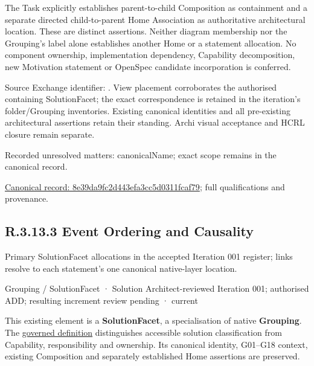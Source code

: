 The Task explicitly establishes parent-to-child Composition as containment and
a separate directed child-to-parent Home Association as authoritative architectural
location. These are distinct assertions. Neither diagram membership nor the
Grouping's label alone establishes another Home or a statement allocation.
No component ownership, implementation dependency, Capability decomposition,
new Motivation statement or OpenSpec candidate incorporation is conferred.



Source Exchange identifier: \texttt{}. View placement corroborates
the authorised containing SolutionFacet; the exact correspondence is retained in the
iteration's folder/Grouping inventories. Existing canonical identities and all
pre-existing architectural assertions retain their standing. Archi visual
acceptance and HCRL closure remain separate.


{\small Recorded unresolved matters: canonicalName; exact scope remains in the canonical record.}\par
{\footnotesize \href{../../../../../../../continuum/grouping/8e39da9fc2d443efa3cc5d0311fcaf79.md}{Canonical record: 8e39da9fc2d443efa3cc5d0311fcaf79}; full qualifications and provenance.}\par
\subsection*{R.3.13.3 Event Ordering and Causality}
\label{navigation:R.3.13.3}

Primary SolutionFacet allocations in the accepted Iteration 001 register; links resolve to each statement’s one canonical native-layer location.\par
\label{element:432d52cc3de5443896a4559f215ece9f}
{\small Grouping / SolutionFacet · Solution Architect-reviewed Iteration 001; authorised ADD; resulting increment review pending · current}\par

This existing element is a \textbf{SolutionFacet}, a specialisation of native
\textbf{Grouping}. The \href{\detokenize{../../../../../../../governance/continuum-representation.md#solutionfacet-classification--1119-candidate}}{governed definition}
distinguishes accessible solution classification from Capability, responsibility
and ownership. Its canonical identity, G01–G18 context, existing Composition
and separately established Home assertions are preserved.



